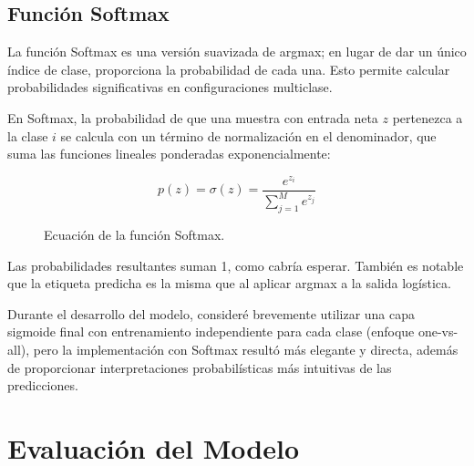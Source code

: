 \subsection{Función Softmax}
La función Softmax es una versión suavizada de argmax; en lugar de dar un único índice de clase, proporciona la probabilidad de cada una. Esto permite calcular probabilidades significativas en configuraciones multiclase.

En Softmax, la probabilidad de que una muestra con entrada neta $z$ pertenezca a la clase $i$ se calcula con un término de normalización en el denominador, que suma las funciones lineales ponderadas exponencialmente:

\begin{figure}[h!]
    \centering
    \begin{equation}
        p(z) = \sigma(z) = \frac{e^{z_i}}{\sum_{j=1}^M e^{z_j}}
    \end{equation}
    \caption{Ecuación de la función Softmax.}
    \label{fig:softmax_equation}
\end{figure}

Las probabilidades resultantes suman 1, como cabría esperar. También es notable que la etiqueta predicha es la misma que al aplicar argmax a la salida logística.

Durante el desarrollo del modelo, consideré brevemente utilizar una capa sigmoide final con entrenamiento independiente para cada clase (enfoque one-vs-all), pero la implementación con Softmax resultó más elegante y directa, además de proporcionar interpretaciones probabilísticas más intuitivas de las predicciones.

\section{Evaluación del Modelo}

